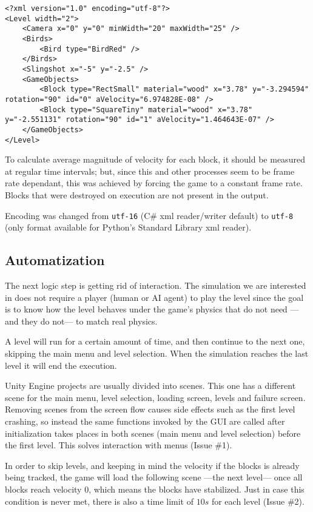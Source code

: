 \lstset{language=XML}
\begin{lstlisting}[caption=Sample level output to show format, label=xmlsampleOUT]
<?xml version="1.0" encoding="utf-8"?>
<Level width="2">
	<Camera x="0" y="0" minWidth="20" maxWidth="25" />
	<Birds>
		<Bird type="BirdRed" />
	</Birds>
	<Slingshot x="-5" y="-2.5" />
	<GameObjects>
		<Block type="RectSmall" material="wood" x="3.78" y="-3.294594" rotation="90" id="0" aVelocity="6.974828E-08" />
		<Block type="SquareTiny" material="wood" x="3.78" y="-2.551131" rotation="90" id="1" aVelocity="1.464643E-07" />
	</GameObjects>
</Level>
\end{lstlisting}

To calculate average magnitude of velocity for each block, it should be measured at regular time intervals; but, since this and other processes seem to be frame rate dependant, this was achieved by forcing the game to a constant frame rate. Blocks that were destroyed on execution are not present in the output.

Encoding was changed from \texttt{utf-16} (C\# xml reader/writer default) to \texttt{utf-8} (only format available for Python's Standard Library xml reader).

\subsection{Automatization}

The next logic step is getting rid of interaction. The simulation we are interested in does not require a player (human or AI agent) to play the level since the goal is to know how the level behaves under the game's physics that do not need ---and they do not--- to match real physics. 

A level will run for a certain amount of time, and then continue to the next one, skipping the main menu and level selection. When the simulation reaches the last level it will end the execution.

Unity Engine projects are usually divided into scenes. This one has a different scene for the main menu, level selection, loading screen, levels and failure screen. Removing scenes from the screen flow causes side effects such as the first level crashing, so instead the same functions invoked by the \acs{GUI} are called after initialization takes places in both scenes (main menu and level selection) before the first level. This solves interaction with menus (Issue \#1). 

In order to skip levels, and keeping in mind the velocity if the blocks is already being tracked, the game will load the following scene ---the next level--- once all blocks reach velocity $0$, which means the blocks have stabilized. Just in case this condition is never met, there is also a time limit of $10s$ for each level (Issue \#2). 

